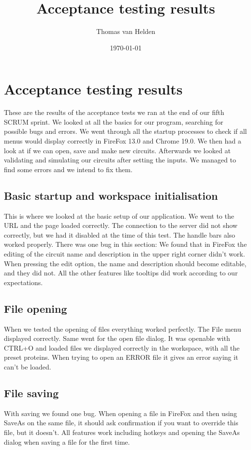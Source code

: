 \documentclass{article}
\begin{document}
\title{Acceptance testing results}
\author{Thomas van Helden}
\date{\today}
\maketitle



\section{Acceptance testing results}
These are the results of the acceptance tests we ran at the end of our fifth SCRUM sprint. We looked at all the basics for our program, searching for possible bugs and errors. We went through all the startup processes to check if all menus would display correctly in FireFox 13.0 and Chrome 19.0. We then had a look at if we can open, save and make new circuits. Afterwards we looked at validating and simulating our circuits after setting the inputs. We managed to find some errors and we intend to fix them.

\subsection{Basic startup and workspace initialisation}
This is where we looked at the basic setup  of our application. We went to the URL and the page loaded correctly. The connection to the server did not show correctly, but we had it disabled at the time of this test. The handle bars also worked properly. There was one bug in this section: We found that in FireFox the editing of the circuit name and description in the upper right corner didn't work. When pressing the edit option, the name and description should become editable, and they did not.
All the other features like tooltips did work according to our expectations.

\subsection{File opening}
When we tested the opening of files everything worked perfectly. The File menu displayed correctly. Same went for the open file dialog. It was openable with CTRL+O and loaded files we displayed correctly in the workspace, with all the preset proteins.
When trying to open an ERROR file it gives an error saying it can't be loaded.

\subsection{File saving}
With saving we found one bug. When opening a file in FireFox and then using SaveAs on the same file, it should ask confirmation if you want to override this file, but it doesn't. All features work including hotkeys and opening the SaveAs dialog when saving a file for the first time.
\end{document}
